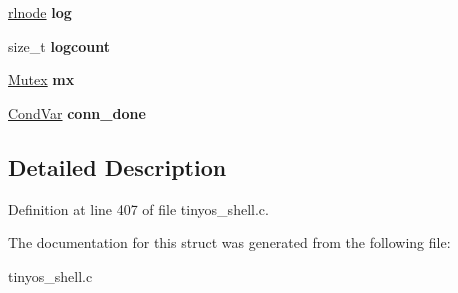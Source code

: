 \begin{DoxyCompactItemize}
\hyperlink{group__rlists_ga8f6244877f7ce2322c90525217ea6e7a}{rlnode} {\bfseries log}
\item 
\mbox{\label{struct____rs__globals_ad1001e26c768cecab1408d19f025d3f8}} 
size\+\_\+t {\bfseries logcount}
\item 
\mbox{\label{struct____rs__globals_ae6f58855b0c5911cacb493a1f305c9e3}} 
\hyperlink{group__syscalls_gaef2ec62cae8e0031fd19fc8b91083ade}{Mutex} {\bfseries mx}
\item 
\mbox{\label{struct____rs__globals_acded897204308c539cab184093cd6207}} 
\hyperlink{structCondVar}{Cond\+Var} {\bfseries conn\+\_\+done}
\end{DoxyCompactItemize}


\subsection{Detailed Description}


Definition at line 407 of file tinyos\+\_\+shell.\+c.



The documentation for this struct was generated from the following file\+:\begin{DoxyCompactItemize}
\item 
tinyos\+\_\+shell.\+c\end{DoxyCompactItemize}
